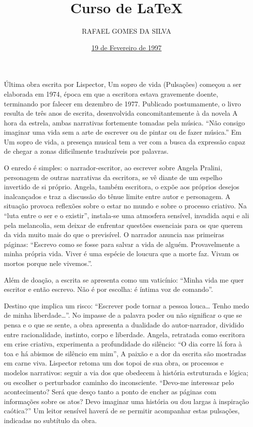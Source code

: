 \documentclass{article}
\begin{document}
	\title{\textbf{Curso de LaTeX}}
	\author{RAFAEL GOMES DA SILVA}
	\date{\underline{19 de Fevereiro de 1997}}
	\maketitle
	Última obra escrita por Lispector, Um sopro de vida (Pulsações) começou a ser elaborada em 1974, época em que a escritora estava gravemente doente, terminando por falecer em dezembro de 1977. Publicado postumamente, o livro resulta de três anos de escrita, desenvolvida concomitantemente à da novela A hora da estrela, ambas narrativas fortemente tomadas pela música. “Não consigo imaginar uma vida sem a arte de escrever ou de pintar ou de fazer música.” Em Um sopro de vida, a presença musical tem a ver com a busca da expressão capaz de chegar a zonas dificilmente traduzíveis por palavras.
	
	O enredo é simples: o narrador-escritor, ao escrever sobre Angela Pralini, personagem de outras narrativas da escritora, se vê diante de um espelho invertido de si próprio. Angela, também escritora, o expõe aos próprios desejos inalcançados e traz a discussão do tênue limite entre autor e personagem. A situação provoca reflexões sobre o estar no mundo e sobre o processo criativo. Na “luta entre o ser e o existir”, instala-se uma atmosfera sensível, invadida aqui e ali pela melancolia, sem deixar de enfrentar questões essenciais para os que querem da vida muito mais do que o previsível. O narrador anuncia nas primeiras páginas: “Escrevo como se fosse para salvar a vida de alguém. Provavelmente a minha própria vida. Viver é uma espécie de loucura que a morte faz. Vivam os mortos porque nele vivemos.”.
	
	Além de doação, a escrita se apresenta como um vaticínio: “Minha vida me quer escritor e então escrevo. Não é por escolha: é íntima voz de comando”.
	
	Destino que implica um risco: “Escrever pode tornar a pessoa louca… Tenho medo de minha liberdade…”. No impasse de a palavra poder ou não significar o que se pensa e o que se sente, a obra apresenta a dualidade do autor-narrador, dividido entre racionalidade, instinto, corpo e liberdade. Angela, retratada como escritora em crise criativa, experimenta a profundidade do silêncio: “O dia corre lá fora à toa e há abismos de silêncio em mim”, A paixão e a dor da escrita são mostradas em carne viva. Lispector retoma um dos topoi de sua obra, os processos e modelos narrativos: seguir a via dos que obedecem à história estruturada e lógica; ou escolher o perturbador caminho do inconsciente. “Devo-me interessar pelo acontecimento? Será que desço tanto a ponto de encher as páginas com informações sobre os atos? Devo imaginar uma história ou dou largas à inspiração caótica?” Um leitor sensível haverá de se permitir acompanhar estas pulsações, indicadas no subtítulo da obra.
	
\end{document}
